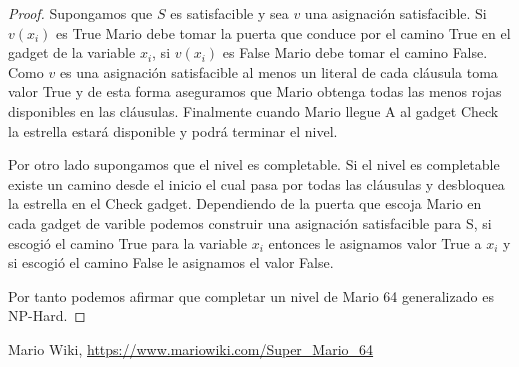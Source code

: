 \documentclass[runningheads]{llncs}
\begin{document}
\begin{proof}
Supongamos que $S$ es satisfacible y sea $v$ una asignación satisfacible. Si $v(x_i)$ es True Mario debe tomar 
la puerta que conduce por el camino True en el gadget de la variable $x_i$, si $v(x_i)$ es False Mario debe tomar
el camino False. Como $v$ es una asignación satisfacible al menos un literal de cada cláusula toma valor True y de esta
forma aseguramos que Mario obtenga todas las menos rojas disponibles en las cláusulas. Finalmente cuando Mario llegue A
al gadget Check la estrella estará disponible y podrá terminar el nivel.

Por otro lado supongamos que el nivel es completable. Si el nivel es completable existe un camino desde el inicio el cual
pasa por todas las cláusulas y desbloquea la estrella en el Check gadget. Dependiendo de la puerta que escoja Mario en cada gadget de varible podemos construir
una asignación satisfacible para S, si escogió el camino True para la variable $x_i$ entonces le asignamos valor True a $x_i$ y si 
escogió el camino False le asignamos el valor False.

Por tanto podemos afirmar que completar un nivel de Mario 64 generalizado es NP-Hard.

\end{proof}


%
%
%
% 
% 
%
\begin{thebibliography}{8}


Mario Wiki, \url{https://www.mariowiki.com/Super_Mario_64} 

\end{thebibliography}
\end{document}
